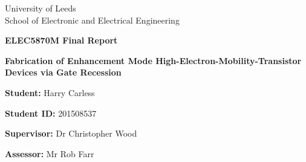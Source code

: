 \begin{titlepage}
  \thispagestyle{empty}
  \centering
  {\large University of Leeds\\
  School of Electronic and Electrical Engineering\par}
  \vspace{58mm}

  {\LARGE \textbf{ELEC5870M Final Report} \par}
  \vspace{8mm}

  {\Large \textbf{Fabrication of Enhancement Mode High-Electron-Mobility-Transistor Devices via Gate Recession}\par}
  \vspace{12mm}

  {\normalsize \textbf{Student:} Harry Carless\par}
  {\normalsize \textbf{Student ID:} 201508537\par}
  \vspace{6mm}
  
  {\normalsize \textbf{Supervisor:} Dr Christopher Wood\par}
  {\normalsize \textbf{Assessor:} Mr Rob Farr\par}
  \vfill

\end{titlepage}
